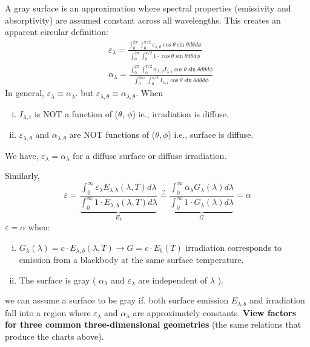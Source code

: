 A gray surface is an approximation where spectral properties (emissivity and absorptivity) are assumed constant across all wavelengths. This creates an apparent circular definition:
\[
    \begin{aligned}
        & \varepsilon_\lambda=\frac{\int_0^{2 \pi} \int_0^{\pi / 2} \varepsilon_{\lambda, \theta} \cos \theta \sin \theta d \theta d \phi}{\int_0^{2 \pi} \int_0^{\pi / 2} 1 \cdot \cos \theta \sin \theta d \theta d \phi}
        \\[1em]
        & \alpha_\lambda=\frac{\int_0^{2 \pi} \int_0^{\pi / 2} \alpha_{\lambda, \theta} I_{\lambda, i} \cos \theta \sin \theta d \theta d \phi}{\int_0^{2 \pi \pi} \int_0^{\pi / 2} I_{\lambda, i} \cos \theta \sin \theta d \theta d \phi}
\end{aligned}
\]
In general, $\varepsilon_\lambda \equiv \alpha_\lambda$. but $\varepsilon_{\lambda, \theta} \equiv \alpha_{\lambda, \theta}$. When
\begin{enumerate}[(i)]
    \item $I_{\lambda, i}$ is NOT a function of ($\theta$, $\phi$) ie., irradiation is diffuse.
    \item $\varepsilon_{\lambda, \theta}$ and $\alpha_{\lambda, \theta}$ are NOT functions of ($\theta, \phi$) i.e., surface is diffuse.
\end{enumerate}
%
We have, $\varepsilon_\lambda=\alpha_\lambda$ for a diffuse surface or diffuse irradiation.

\textbf{}

Similarly, 
\[
    \varepsilon=\frac{\int_0^{\infty} \varepsilon_\lambda E_{\lambda, b}(\lambda, T) d \lambda}{\underbrace{\int_0^{\infty} 1 \cdot E_{\lambda, b}(\lambda, T) d \lambda}_{E_b}}
    \stackrel{?}{=} 
    \frac{\int_0^{\infty} \alpha_\lambda G_\lambda(\lambda) d \lambda}{\underbrace{\int_0^{\infty} 1 \cdot G_\lambda(\lambda) d \lambda}_{G}}=\alpha
\]
%
$\varepsilon=\alpha$ when:
\begin{enumerate}[(i)]
    \item $G_\lambda(\lambda)=c \cdot E_{\lambda, b}(\lambda, T) \longrightarrow G=c \cdot E_b(T)$ irradiation corresponds to emission from a blackbody at the same surface temperature.
    \item The surface is gray ( $\alpha_\lambda$ and $\varepsilon_\lambda$ are independent of $\lambda$ ).
\end{enumerate}
%
we can assume a surface to be gray if.
both surface emission $E_{\lambda, b}$ and irradiation
fall into a region where $\varepsilon_\lambda$ and $\alpha_\lambda$ are approximately constants.
%
\noindent\textbf{View factors for three common three-dimensional geometries}
(the same relations that produce the charts above).

